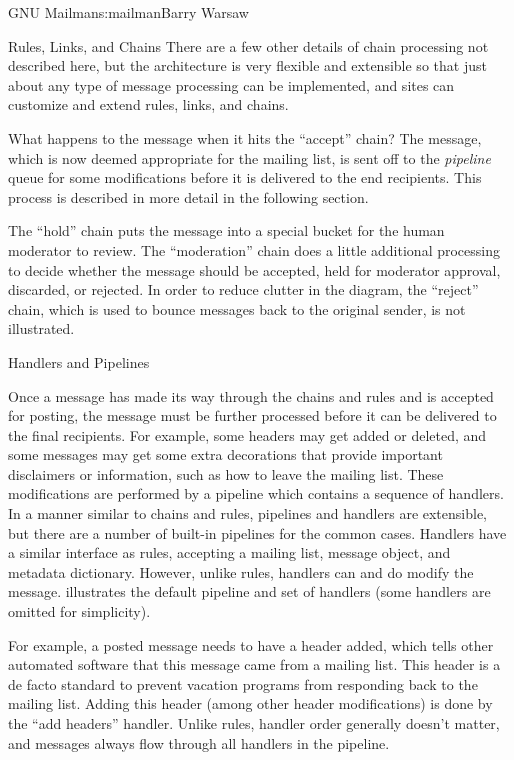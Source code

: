 \begin{aosachapter}{GNU Mailman}{s:mailman}{Barry Warsaw}
\begin{aosasect1}{Rules, Links, and Chains}
There are a few other details of chain processing not described here,
but the architecture is very flexible and extensible so that just
about any type of message processing can be implemented, and sites can
customize and extend rules, links, and chains.

What happens to the message when it hits the ``accept'' chain?  The
message, which is now deemed appropriate for the mailing list, is sent
off to the \emph{pipeline} queue for some modifications before it is
delivered to the end recipients.  This process is described in more
detail in the following section.

The ``hold'' chain puts the message into a special bucket for the
human moderator to review.  The ``moderation'' chain does a little
additional processing to decide whether the message should be
accepted, held for moderator approval, discarded, or rejected.  In
order to reduce clutter in the diagram, the ``reject'' chain, which is
used to bounce messages back to the original sender, is not
illustrated.

\end{aosasect1}

\begin{aosasect1}{Handlers and Pipelines}

Once a message has made its way through the chains and rules and 
is accepted for posting, the message must be further processed
before it can be delivered to the final recipients.  For example, some
headers may get added or deleted, and some messages may get some extra
decorations that provide important disclaimers or information, such as
how to leave the mailing list.  These modifications are performed by a
pipeline which contains a sequence of handlers.  In a
manner similar to chains and rules, pipelines and handlers are
extensible, but there are a number of built-in pipelines for the
common cases.  Handlers have a similar interface as rules, accepting a
mailing list, message object, and metadata dictionary.  However, unlike
rules, handlers can and do modify the message.  
 illustrates the default pipeline and
set of handlers (some handlers are omitted for simplicity).


For example, a posted message needs to have a 
header added, which tells other automated software that this message
came from a mailing list.  This header is a de facto standard to
prevent vacation programs from responding back to the mailing list.
Adding this header (among other header modifications) is done by the
``add headers'' handler.  Unlike rules, handler order generally
doesn't matter, and messages always flow through all handlers in the
pipeline.


\end{aosasect1}
\end{aosachapter}
